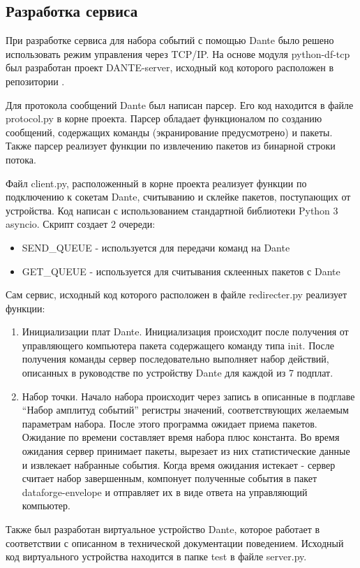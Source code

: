 \documentclass[a4paper,14pt]{extreport}
\begin{document}
\subsection{Разработка сервиса}
При разработке сервиса для набора событий с помощью Dante было решено использовать режим управления через TCP/IP. На основе модуля python-df-tcp был разработан проект DANTE-server, исходный код которого расположен в репозитории \cite{dante-server}.

Для протокола сообщений Dante был написан парсер. Его код находится в файле protocol.py в корне проекта. Парсер обладает функционалом по созданию сообщений, содержащих команды (экранирование предусмотрено) и пакеты. Также парсер реализует функции по извлечению пакетов из бинарной строки потока.

Файл client.py, расположенный в корне проекта реализует функции по подключению к сокетам Dante, считыванию и склейке пакетов, поступающих от устройства. Код написан с использованием стандартной библиотеки Python 3 asyncio. Скрипт создает 2 очереди:

\begin{itemize}
\item SEND\_QUEUE - используется для передачи команд на Dante
\item GET\_QUEUE - используется для считывания склеенных пакетов с Dante
\end{itemize}
Сам сервис, исходный код которого расположен в файле redirecter.py реализует функции:

\begin{enumerate}
\item Инициализации плат Dante. Инициализация происходит после получения от управляющего компьютера пакета содержащего команду типа init. После получения команды сервер последовательно выполняет набор действий, описанных в руководстве по устройству Dante для каждой из 7 подплат. 
\item Набор точки. Начало набора происходит через запись в описанные в подглаве “Набор амплитуд событий” регистры значений, соответствующих желаемым параметрам набора. После этого программа ожидает приема пакетов. Ожидание по времени составляет время набора плюс константа. Во время ожидания сервер принимает пакеты, вырезает из них статистические данные и извлекает набранные события. Когда время ожидания истекает - сервер считает набор завершенным, компонует полученные события в пакет dataforge-envelope и отправляет их в виде ответа на управляющий компьютер.
\end{enumerate}
Также был разработан виртуальное устройство Dante, которое работает в соответствии с описанном в технической документации поведением. Исходный код виртуального устройства находится в папке test в файле server.py.
\end{document}
